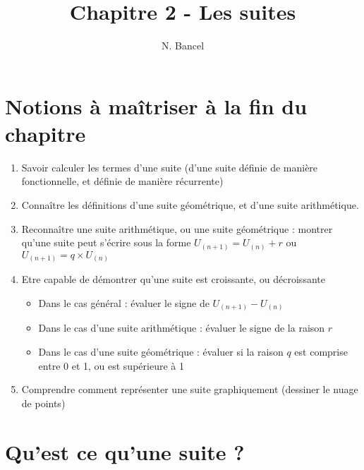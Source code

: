 \documentclass[a4paper,12pt]{article}
\begin{document}
\title{Chapitre 2 - Les suites}
\author{N. Bancel}

\maketitle

\def\WITH_CORRECTION{YES}

\section*{Notions à maîtriser à la fin du chapitre}

\begin{tcolorbox}[colback=gray!10, colframe=gray!50, title=Notions à maîtriser]
  \begin{enumerate}[noitemsep]
      \item Savoir calculer les termes d'une suite (d'une suite définie de manière fonctionnelle, et définie de manière récurrente)
      \item Connaître les définitions d'une suite géométrique, et d'une suite arithmétique. 
      \item Reconnaître une suite arithmétique, ou une suite géométrique : montrer qu'une suite peut s'écrire sous la forme $U_{(n+1)} = U_{(n)} + r$ ou $U_{(n+1)} = q \times U_{(n)}$
      \item Etre capable de démontrer qu'une suite est croissante, ou décroissante
        \begin{itemize}[noitemsep] 
          \item Dans le cas général : évaluer le signe de $U_{(n+1)} - U_{(n)}$
          \item Dans le cas d'une suite arithmétique : évaluer le signe de la raison $r$
          \item Dans le cas d'une suite géométrique : évaluer si la raison $q$ est comprise entre 0 et 1, ou est supérieure à 1
        \end{itemize}
      \item Comprendre comment représenter une suite graphiquement (dessiner le nuage de points)
  \end{enumerate}
  \end{tcolorbox}


\section*{Qu'est ce qu'une suite ?}
\end{document}
